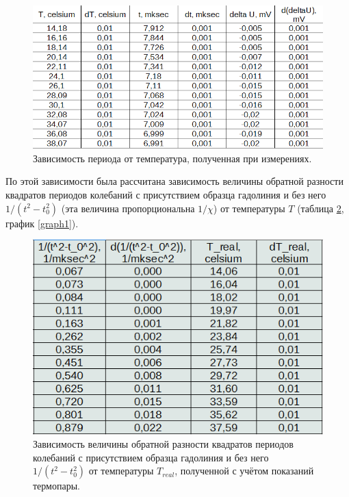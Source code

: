 \documentclass[a4paper,12pt]{article}
\begin{document}
\begin{figure}[ht!]
\centering
\includegraphics[width=160mm]{table1.png}
\caption{Зависимость периода от температура, полученная при измерениях.}
\label{table1}
\end{figure}

По этой зависимости была рассчитана зависимость величины обратной разности квадратов периодов колебаний с присутствием образца гадолиния и без него $1/(t^2-t_0^2)$ (эта величина пропорциональна $1/\chi$) от температуры $T$ (таблица \ref{table2}, график \ref{graph1}).

\begin{figure}[ht!]
\centering
\includegraphics[width=160mm]{table2.png}
\caption{Зависимость величины обратной разности квадратов периодов колебаний с присутствием образца гадолиния и без него $1/(t^2-t_0^2)$ от температуры $T_{real}$, полученной с учётом показаний термопары.}
\label{table2}
\end{figure}
\end{document}
